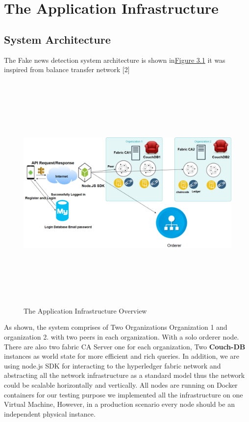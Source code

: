 \chapter{The Application Infrastructure}

\section{System Architecture}

The Fake news detection system architecture is shown in\hyperref[fig:infrastructure]{Figure 3.1} it was inspired from balance transfer network [2]
 \begin{figure}[H]
\includegraphics[width=15cm,height=12cm]{images/infrastructure.png}
\caption{The Application Infrastructure Overview}
\label{fig:infrastructure}
\end{figure}
\cleardoublepage

As shown, the system comprises of Two Organizations Organization 1 and organization 2. with two peers in each organization. 
With a solo orderer node.  There are also two fabric CA Server one for each organization, Two \textbf{Couch-DB} instances as world state for more efficient and rich queries. 
In addition, we are using node.js SDK  for interacting to the hyperledger fabric network and abstracting all the network infrastructure as a standard model thus the network could be scalable horizontally and vertically. All nodes are running on Docker containers for our testing purpose we implemented all the infrastructure on one Virtual Machine, However, in a production scenario every node should be an independent physical instance. \\ 

